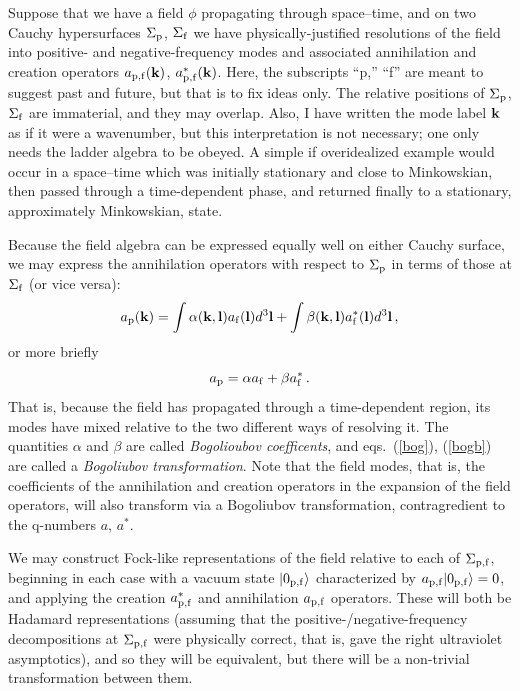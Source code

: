 \documentclass[
%
draft    %
,numberedheadings 
,bibliocites
  ]
  {aipproc}
\begin{document}
Suppose that we have a field $\phi$ propagating through space--time, and on two Cauchy hypersurfaces $\Sigma _{\rm p}$, $\Sigma _{\rm f}$ we have physically-justified resolutions of the field into positive- and negative-frequency modes and associated annihilation and creation operators $a_{\rm p,f}({\bf k})$, $a^*_{\rm p,f}({\bf k})$.  Here, the subscripts ``p,'' ``f'' are meant to suggest past and future, but that is to fix ideas only.  The relative positions of $\Sigma _{\rm p}$, $\Sigma _{\rm f}$ are immaterial, and they may overlap.  Also, I have written the mode label ${\bf k}$ as if it were a wavenumber, but this interpretation is not necessary; one only needs the ladder algebra to be obeyed.
A simple if overidealized example would occur in a space--time which was initially stationary and close to Minkowskian, then passed through a time-dependent phase, and returned finally to a stationary, approximately Minkowskian, state.  


Because the field algebra can be expressed equally well on either Cauchy surface, we may express the annihilation operators with respect to $\Sigma _{\rm p}$ in terms of those at $\Sigma _{\rm f}$ (or vice versa):
\begin{equation}\label{bog}
  a_{\rm p}({\bf k}) =\int \alpha ({\bf k},{\bf l}) a_{\rm f}({\bf l})d^3{\bf l}
  +\int \beta ({\bf k},{\bf l}) a^*_{\rm f}({\bf l})d^3{\bf l}\, ,
\end{equation}
or more briefly
\begin{equation}\label{bogb}
  a_{\rm p} =\alpha  a_{\rm f}
  +\beta a^*_{\rm f}\, .
\end{equation}
That is, because the field has propagated through a time-dependent region, its modes have mixed relative to the two different ways of resolving it.  The quantities $\alpha$ and $\beta$ are called {\em Bogolioubov coefficents}, and eqs.~(\ref{bog}), (\ref{bogb}) are called a {\em Bogoliubov transformation}.  Note that the field modes, that is, the coefficients of the annihilation and creation operators in the expansion of the field operators, will also transform via a Bogoliubov transformation, contragredient to the q-numbers $a$, $a^*$.

We may construct Fock-like representations of the field relative to each of $\Sigma _{\rm p,f}$, beginning in each case with a  vacuum state $|0_{\rm p,f}\rangle$ characterized by $a_{\rm p,f}|0_{\rm p,f}\rangle =0$, and applying the creation $a^*_{\rm p,f}$ and annihilation $a_{\rm p,f}$ operators.  These will both be Hadamard representations (assuming that the positive-/negative-frequency decompositions at $\Sigma _{\rm p,f}$ were physically correct, that is, gave the right ultraviolet asymptotics), and so they will be equivalent, but there will be a non-trivial transformation between them.
\end{document}
